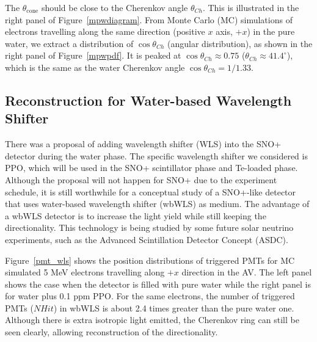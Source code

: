 \documentclass[preprint,12pt]{elsarticle}
\numberwithin{equation}{section}
\begin{document}
The $\theta_\mathrm{cone}$ should be close to the Cherenkov angle $\theta_{Ch}$. This is illustrated in the right panel of Figure~\ref{mpwdiagram}. From Monte Carlo (MC) simulations of electrons travelling along the same direction (positive $x$ axis, $+x$) in the pure water, we extract a distribution of $\cos\theta_{Ch}$ (angular distribution), as shown in the right panel of Figure~\ref{mpwpdf}. It is peaked at $\cos\theta_{Ch}\approx 0.75$ ($\theta_{Ch}\approx 41.4^\circ$), which is the same as the water Cherenkov angle $\cos\theta_{Ch}=1/1.33$.

\subsection{Reconstruction for Water-based Wavelength Shifter}
There was a proposal of adding wavelength shifter (WLS) into the SNO+ detector during the water phase. The specific wavelength shifter we considered is PPO, which will be used in the SNO+ scintillator phase and Te-loaded phase. Although the proposal will not happen for SNO+ due to the experiment schedule, it is still worthwhile for a conceptual study of a SNO+-like detector that uses water-based wavelength shifter (wbWLS) as medium. The advantage of a wbWLS detector is to increase the light yield while still keeping the directionality. This technology is being studied by some future solar neutrino experiments, such as the Advanced Scintillation Detector Concept (ASDC)\cite{Dai,asdc}.

Figure~\ref{pmt_wls} shows the position distributions of triggered PMTs for MC simulated 5 MeV electrons travelling along $+x$ direction in the AV. The left panel shows the case when the detector is filled with pure water while the right panel is for water plus 0.1 ppm PPO. For the same electrons, the number of triggered PMTs ($NHit$) in wbWLS is about 2.4 times greater than the pure water one. Although there is extra isotropic light emitted, the Cherenkov ring can still be seen clearly, allowing reconstruction of the directionality.  
\end{document}
